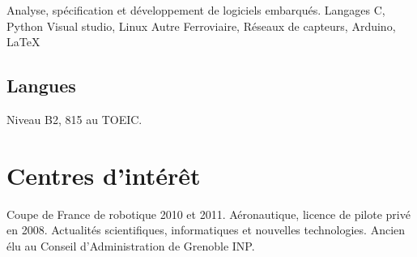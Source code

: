 \documentclass[10pt,a4paper]{moderncv}
\begin{document}
		{Analyse, spécification et développement de logiciels embarqués.\newline{}}
		{Langages}
		{C, Python}
		{Visual studio, Linux\newline{}}
		{Autre}
		{Ferroviaire, Réseaux de capteurs, Arduino, \LaTeX} 

	\subsection{Langues}

		{\small Niveau B2, 815 au TOEIC.\newline{}}

\section{Centres d'intérêt}
	{Coupe de France de robotique 2010 et 2011.\newline{}}
	{Aéronautique, licence de pilote privé en 2008.}
	\cvline{}
	{Actualités scientifiques, informatiques et nouvelles technologies.}
	\cvline{}
	{Ancien élu au Conseil d'Administration de Grenoble INP.}
\end{document}
